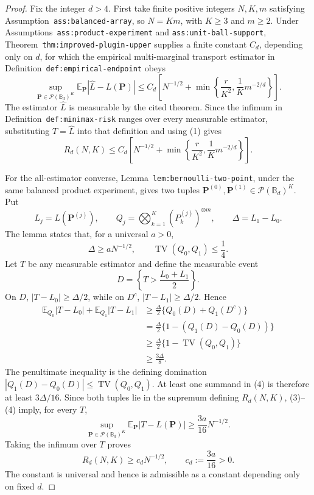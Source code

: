 \documentclass{article}
\begin{document}
\begin{proof}
Fix the integer \(d>4\).  First take finite positive integers \(N,K,m\) satisfying Assumption~\texttt{ass:balanced-array}, so \(N=Km\), with \(K\ge3\) and \(m\ge2\).  Under Assumptions~\texttt{ass:product-experiment} and \texttt{ass:unit-ball-support}, Theorem~\texttt{thm:improved-plugin-upper} supplies a finite constant \(C_d\), depending only on \(d\), for which the empirical multi-marginal transport estimator in Definition~\texttt{def:empirical-endpoint} obeys
\[
\sup_{\mathbf P\in\mathcal P(\mathbb B_d)^K}
\mathbb E_{\mathbf P}|\widehat L-L(\mathbf P)|
\le C_d\left[N^{-1/2}+
\min\left\{\frac r{K^2},\frac1K m^{-2/d}\right\}\right].
\tag{1}
\]
The estimator \(\widehat L\) is measurable by the cited theorem.  Since the infimum in Definition~\texttt{def:minimax-risk} ranges over every measurable estimator, substituting \(T=\widehat L\) into that definition and using (1) gives
\[
R_d(N,K)
\le C_d\left[N^{-1/2}+
\min\left\{\frac r{K^2},\frac1K m^{-2/d}\right\}\right].
\tag{2}
\]

For the all-estimator converse, Lemma~\texttt{lem:bernoulli-two-point}, under the same balanced product experiment, gives two tuples \(\mathbf P^{(0)},\mathbf P^{(1)}\in\mathcal P(\mathbb B_d)^K\).  Put
\[
L_j=L(\mathbf P^{(j)}),
\qquad
Q_j=\bigotimes_{k=1}^K(P_k^{(j)})^{\otimes m},
\qquad
\Delta=L_1-L_0.
\]
The lemma states that, for a universal \(a>0\),
\[
\Delta\ge aN^{-1/2},
\qquad
\operatorname{TV}(Q_0,Q_1)\le\frac14.
\tag{3}
\]
Let \(T\) be any measurable estimator and define the measurable event
\[
D=\left\{T>\frac{L_0+L_1}{2}\right\}.
\]
On \(D\), \(|T-L_0|\ge\Delta/2\), while on \(D^c\), \(|T-L_1|\ge\Delta/2\).  Hence
\[
\begin{aligned}
\mathbb E_{Q_0}|T-L_0|+\mathbb E_{Q_1}|T-L_1|
&\ge\frac\Delta2\{Q_0(D)+Q_1(D^c)\}\\
&=\frac\Delta2\{1-(Q_1(D)-Q_0(D))\}\\
&\ge\frac\Delta2\{1-\operatorname{TV}(Q_0,Q_1)\}\\
&\ge\frac{3\Delta}{8}.
\end{aligned}
\tag{4}
\]
The penultimate inequality is the defining domination \(|Q_1(D)-Q_0(D)|\le\operatorname{TV}(Q_0,Q_1)\).  At least one summand in (4) is therefore at least \(3\Delta/16\).  Since both tuples lie in the supremum defining \(R_d(N,K)\), (3)--(4) imply, for every \(T\),
\[
\sup_{\mathbf P\in\mathcal P(\mathbb B_d)^K}
\mathbb E_{\mathbf P}|T-L(\mathbf P)|
\ge\frac{3a}{16}N^{-1/2}.
\]
Taking the infimum over \(T\) proves
\[
R_d(N,K)\ge c_dN^{-1/2},
\qquad c_d:=\frac{3a}{16}>0.
\tag{5}
\]
The constant is universal and hence is admissible as a constant depending only on fixed \(d\).


\end{proof}
\end{document}
